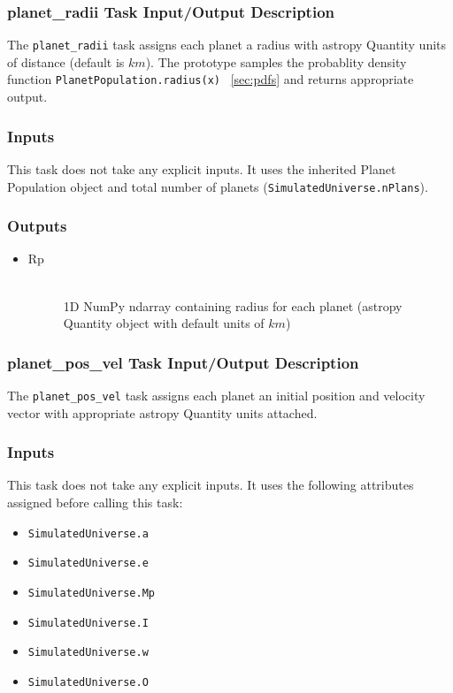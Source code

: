 \documentclass[cleanfoot]{asme2ej}
\begin{document}
\subsubsection{planet\_radii Task Input/Output Description} \label{sec:planetradiitask}
The \verb+planet_radii+ task assigns each planet a radius with astropy Quantity units of distance (default is $ km $). The prototype samples the probablity density function \verb+PlanetPopulation.radius(x)+ ~\ref{sec:pdfs} and returns appropriate output.

\subsubsection*{Inputs}
This task does not take any explicit inputs.  It uses the inherited Planet Population object and total number of planets (\verb+SimulatedUniverse.nPlans+).

\subsubsection*{Outputs}
\begin{itemize}
    \item 
    \begin{description}
        \item[Rp] \hfill \\
        1D NumPy ndarray containing radius for each planet (astropy Quantity object with default units of $ km $)
    \end{description}
\end{itemize}

\subsubsection{planet\_pos\_vel Task Input/Output Description} \label{sec:planetposveltask}
The \verb+planet_pos_vel+ task assigns each planet an initial position and velocity vector with appropriate astropy Quantity units attached.

\subsubsection*{Inputs}
This task does not take any explicit inputs.  It uses the following attributes assigned before calling this task:
\begin{itemize}
    \item \verb+SimulatedUniverse.a+
    \item \verb+SimulatedUniverse.e+
    \item \verb+SimulatedUniverse.Mp+
    \item \verb+SimulatedUniverse.I+
    \item \verb+SimulatedUniverse.w+
    \item \verb+SimulatedUniverse.O+
\end{itemize}
\end{document}
